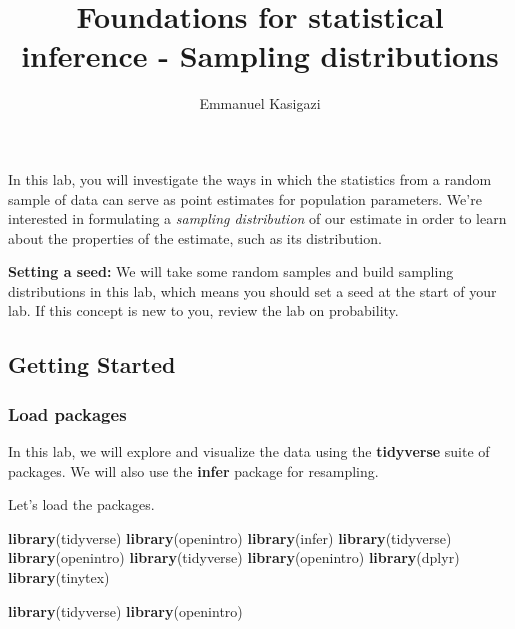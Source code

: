 \documentclass[
]{article}
\title{Foundations for statistical inference - Sampling distributions}
\author{Emmanuel Kasigazi}
\date{}
\newenvironment{Shaded}{\begin{snugshade}}{\end{snugshade}}
\newcommand{\FunctionTok}[1]{\textcolor[rgb]{0.13,0.29,0.53}{\textbf{#1}}}
\newcommand{\NormalTok}[1]{#1}
\begin{document}
\maketitle

In this lab, you will investigate the ways in which the statistics from
a random sample of data can serve as point estimates for population
parameters. We're interested in formulating a \emph{sampling
distribution} of our estimate in order to learn about the properties of
the estimate, such as its distribution.

\label{boxedtext}
\textbf{Setting a seed:} We will take some random samples and build
sampling distributions in this lab, which means you should set a seed at
the start of your lab. If this concept is new to you, review the lab on
probability.

\subsection{Getting Started}\label{getting-started}

\subsubsection{Load packages}\label{load-packages}

In this lab, we will explore and visualize the data using the
\textbf{tidyverse} suite of packages. We will also use the
\textbf{infer} package for resampling.

Let's load the packages.

\begin{Shaded}
\begin{Highlighting}[]
\FunctionTok{library}\NormalTok{(tidyverse)}
\FunctionTok{library}\NormalTok{(openintro)}
\FunctionTok{library}\NormalTok{(infer)}
\FunctionTok{library}\NormalTok{(tidyverse)}
\FunctionTok{library}\NormalTok{(openintro)}
\FunctionTok{library}\NormalTok{(tidyverse)}
\FunctionTok{library}\NormalTok{(openintro)}
\FunctionTok{library}\NormalTok{(dplyr)}
\FunctionTok{library}\NormalTok{(tinytex)}
\end{Highlighting}
\end{Shaded}

\begin{Shaded}
\begin{Highlighting}[]
\FunctionTok{library}\NormalTok{(tidyverse)}
\FunctionTok{library}\NormalTok{(openintro)}
\end{Highlighting}
\end{Shaded}
\end{document}
